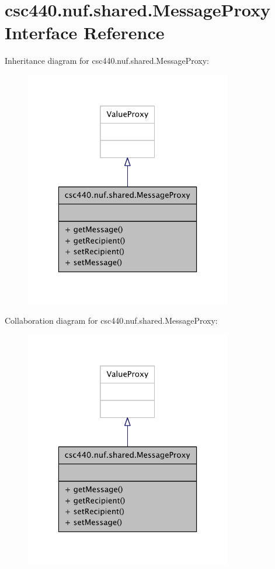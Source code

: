 \hypertarget{interfacecsc440_1_1nuf_1_1shared_1_1_message_proxy}{\section{csc440.\-nuf.\-shared.\-Message\-Proxy Interface Reference}
\label{interfacecsc440_1_1nuf_1_1shared_1_1_message_proxy}
}


Inheritance diagram for csc440.\-nuf.\-shared.\-Message\-Proxy\-:
\nopagebreak
\begin{figure}[H]
\begin{center}
\leavevmode
\includegraphics[width=256pt]{interfacecsc440_1_1nuf_1_1shared_1_1_message_proxy__inherit__graph}
\end{center}
\end{figure}


Collaboration diagram for csc440.\-nuf.\-shared.\-Message\-Proxy\-:
\nopagebreak
\begin{figure}[H]
\begin{center}
\leavevmode
\includegraphics[width=256pt]{interfacecsc440_1_1nuf_1_1shared_1_1_message_proxy__coll__graph}
\end{center}
\end{figure}
